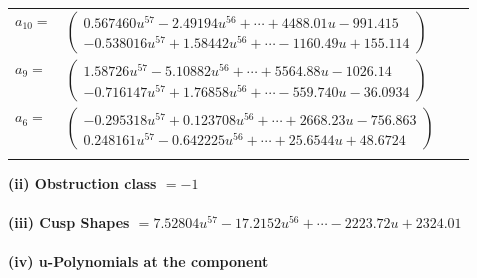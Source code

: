 \documentclass[1p]{elsarticle_modified}
\theoremstyle{definition}
\begin{document}
\begin{tabular}{m{7pt} m{180pt} m{7pt} m{180pt} }
\flushright $a_{10}=$&$\begin{pmatrix}0.567460 u^{57}-2.49194 u^{56}+\cdots+4488.01 u-991.415\\-0.538016 u^{57}+1.58442 u^{56}+\cdots-1160.49 u+155.114\end{pmatrix}$ \\
\flushright $a_{9}=$&$\begin{pmatrix}1.58726 u^{57}-5.10882 u^{56}+\cdots+5564.88 u-1026.14\\-0.716147 u^{57}+1.76858 u^{56}+\cdots-559.740 u-36.0934\end{pmatrix}$ \\
\flushright $a_{6}=$&$\begin{pmatrix}-0.295318 u^{57}+0.123708 u^{56}+\cdots+2668.23 u-756.863\\0.248161 u^{57}-0.642225 u^{56}+\cdots+25.6544 u+48.6724\end{pmatrix}$\\&\end{tabular}
\flushleft \textbf{(ii) Obstruction class $= -1$}\\~\\
\flushleft \textbf{(iii) Cusp Shapes $= 7.52804 u^{57}-17.2152 u^{56}+\cdots-2223.72 u+2324.01$}\\~\\
\newpage\renewcommand{\arraystretch}{1}
\flushleft \textbf{(iv) u-Polynomials at the component}\newline \\
\end{document}
